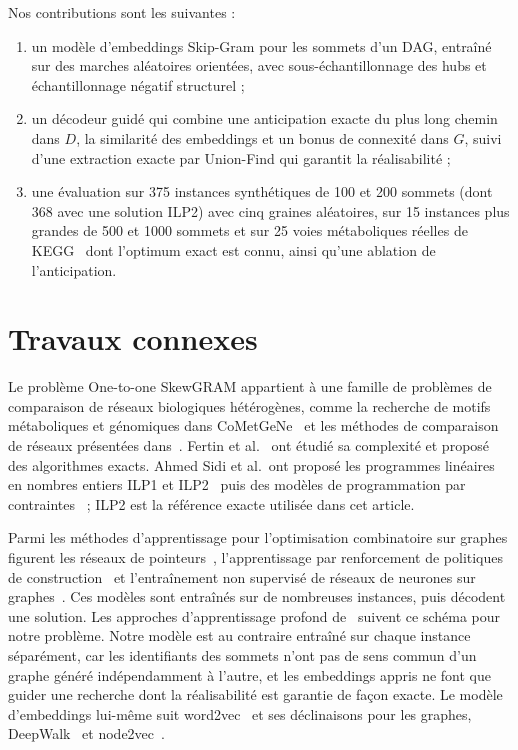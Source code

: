 \documentclass{llncs}
\begin{document}
Nos contributions sont les suivantes :
\begin{enumerate}
\item un modèle d'embeddings Skip-Gram pour les sommets d'un DAG, entraîné sur des marches aléatoires orientées, avec sous-échantillonnage des hubs et échantillonnage négatif structurel ;
\item un décodeur guidé qui combine une anticipation exacte du plus long chemin dans $D$, la similarité des embeddings et un bonus de connexité dans $G$, suivi d'une extraction exacte par Union-Find qui garantit la réalisabilité ;
\item une évaluation sur 375 instances synthétiques de 100 et 200 sommets (dont 368 avec une solution ILP2) avec cinq graines aléatoires, sur 15 instances plus grandes de 500 et 1000 sommets et sur 25 voies métaboliques réelles de KEGG~\cite{kanehisa2000} dont l'optimum exact est connu, ainsi qu'une ablation de l'anticipation.
\end{enumerate}

\section{Travaux connexes}

Le problème One-to-one SkewGRAM appartient à une famille de problèmes de comparaison de réseaux biologiques hétérogènes, comme la recherche de motifs métaboliques et génomiques dans CoMetGeNe~\cite{zaharia} et les méthodes de comparaison de réseaux présentées dans~\cite{sharan2006}. Fertin et al.~\cite{fertin2012} ont étudié sa complexité et proposé des algorithmes exacts. Ahmed Sidi et al.\ ont proposé les programmes linéaires en nombres entiers ILP1 et ILP2~\cite{sidi2022} puis des modèles de programmation par contraintes~\cite{sidi} ; ILP2 est la référence exacte utilisée dans cet article.

Parmi les méthodes d'apprentissage pour l'optimisation combinatoire sur graphes figurent les réseaux de pointeurs~\cite{vinyals2015}, l'apprentissage par renforcement de politiques de construction~\cite{bello2016,dai2017} et l'entraînement non supervisé de réseaux de neurones sur graphes~\cite{karalias2020}. Ces modèles sont entraînés sur de nombreuses instances, puis décodent une solution. Les approches d'apprentissage profond de~\cite{sidi_dl} suivent ce schéma pour notre problème. Notre modèle est au contraire entraîné sur chaque instance séparément, car les identifiants des sommets n'ont pas de sens commun d'un graphe généré indépendamment à l'autre, et les embeddings appris ne font que guider une recherche dont la réalisabilité est garantie de façon exacte. Le modèle d'embeddings lui-même suit word2vec~\cite{mikolov} et ses déclinaisons pour les graphes, DeepWalk~\cite{perozzi} et node2vec~\cite{grover}.
\end{document}
